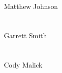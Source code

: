 \documentclass[10pt,letterpaper,onecolumn,draftclsnofoot]{IEEEtran}
\begin{document}
\noindent Matthew Johnson\hspace{0.3cm} \makebox[1.5in]{\hrulefill}\\\\\\
Garrett Smith\hspace{0.7cm} \makebox[1.5in]{\hrulefill}\\\\\\
Cody Malick\hspace{0.7cm} \makebox[1.5in]{\hrulefill}\\\\\\
\end{document}
